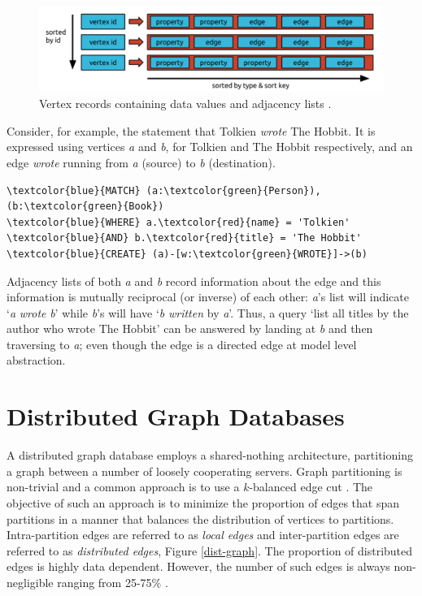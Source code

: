 \documentclass[sigplan,10pt]{acmart}
\begin{document}
\begin{figure}[ht]
  \centering
  \includegraphics[width=\linewidth]{./images/janusgraph-adj-list}
  \caption{Vertex records containing data values and adjacency lists \cite{janusgraph}.}
  \label{adj-list}
\end{figure}

Consider, for example, the statement that Tolkien \textit{wrote} The Hobbit. It is expressed using vertices \emph{a} and \emph{b}, for Tolkien and The Hobbit respectively, and an edge \textit{wrote} running from \emph{a} (source) to \emph{b} (destination).
\begin{Verbatim}[commandchars=\\\{\},fontsize=\small,xleftmargin=.2in]
\textcolor{blue}{MATCH} (a:\textcolor{green}{Person}), (b:\textcolor{green}{Book})
\textcolor{blue}{WHERE} a.\textcolor{red}{name} = 'Tolkien' \textcolor{blue}{AND} b.\textcolor{red}{title} = 'The Hobbit'
\textcolor{blue}{CREATE} (a)-[w:\textcolor{green}{WROTE}]->(b)
\end{Verbatim}

Adjacency lists of both \emph{a} and \emph{b} record information about the edge and this information is mutually reciprocal (or inverse) of each other: \emph{a}'s list will indicate `\emph{a} \emph{wrote} \emph{b}' while \emph{b}'s will have `\emph{b} \emph{written} by \emph{a}'. Thus, a query `list all titles by the author who wrote The Hobbit' can be answered by landing at \emph{b} and then traversing to \emph{a}; even though the edge is a directed edge at model level abstraction.

\section{Distributed Graph Databases}

A distributed graph database employs a shared-nothing architecture, partitioning a graph between a number of loosely cooperating servers. Graph partitioning is non-trivial and a common approach is to use a $k$-balanced edge cut \cite{Huang2016}. The objective of such an approach is to minimize the proportion of edges that span partitions in a manner that balances the distribution of vertices to partitions. Intra-partition edges are referred to as \textit{local edges} and inter-partition edges are referred to as \textit{distributed edges}, Figure \ref{dist-graph}. The proportion of distributed edges is highly data dependent. However, the number of such edges is always non-negligible ranging from 25-75\% \cite{Huang2016}.
\end{document}
